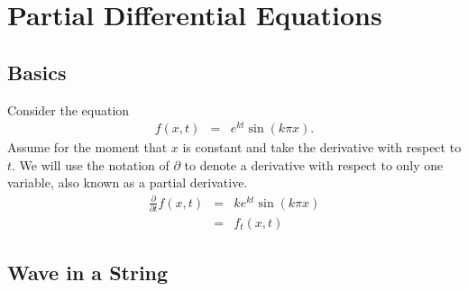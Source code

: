 \chapter{Partial Differential Equations}

\section{Basics}

Consider the equation
\begin{eqnarray}
f(x,t) &=& e^{kt}\sin({k\pi x}).
\end{eqnarray}
Assume for the moment that $x$ is constant and take the derivative with respect to $t$.  We will use the notation of $\partial$ to denote a derivative with respect to only one variable, also known as a partial derivative.
\begin{eqnarray}
\frac{\partial}{\partial t}f(x,t)
 &=& ke^{kt}\sin({k\pi x}) \\
 &=& f_t(x,t)
\end{eqnarray}


\section{Wave in a String}

